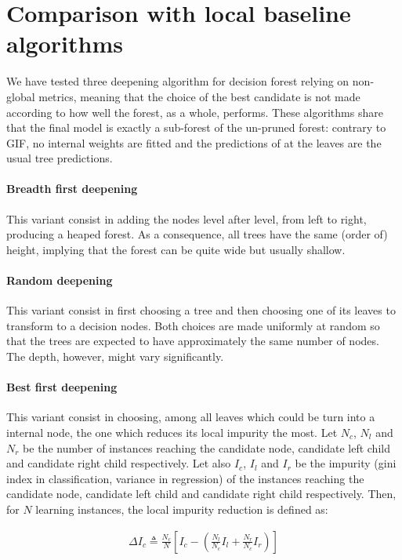 \documentclass{article}
\begin{document}
\section{Comparison with local baseline algorithms}
We have tested three deepening algorithm for decision forest relying on 
non-global metrics, meaning that the choice of the best candidate is not made 
according to how well the forest, as a whole, performs. These algorithms share 
that the final model is exactly a sub-forest of the un-pruned forest: contrary 
to GIF, no internal weights are fitted and the predictions of at the leaves are 
the usual tree predictions.

\paragraph{Breadth first deepening}
This variant consist in adding the nodes level after level, from left to right, 
producing a heaped forest. As a consequence, all trees have the same (order of) 
height, implying that the forest can be quite wide but usually shallow.

\paragraph{Random deepening}
This variant consist in first choosing a tree and then choosing one of its 
leaves to transform to a decision nodes. Both choices are made uniformly at 
random so that the trees are expected to have approximately the same number of 
nodes. The depth, however, might vary significantly.

\paragraph{Best first deepening}
This variant consist in choosing, among all leaves which could be turn into a 
internal node, the one which reduces its local impurity the most. 
Let $N_c$, $N_l$ and $N_r$ be the number of instances 
reaching the candidate node, candidate left child and candidate right child 
respectively.
Let also $I_c$, $I_l$ and $I_r$ be the impurity (gini index in classification, 
variance in regression) of the instances reaching the candidate node, candidate 
left child and candidate right child respectively. 
Then, for $N$ learning instances, the local impurity reduction is 
defined as:

\begin{align}
\Delta I_c \triangleq \frac{N_c}{N} \left[ I_c - \left( \frac{N_l}{N_c} I_l + 
\frac{N_r}{N_c} I_r \right)\right]
\end{align}
\end{document}
